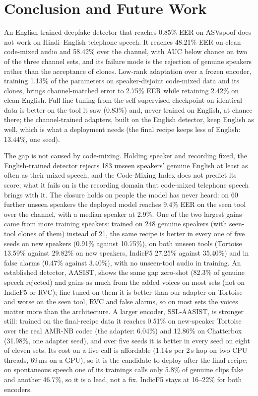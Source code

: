 \section{Conclusion and Future Work}
\label{sec:conclusion}

An English-trained deepfake detector that reaches 0.85\% EER on ASVspoof does not
work on Hindi--English telephone speech. It reaches 48.21\% EER on clean code-mixed
audio and 58.42\% over the channel, with AUC below chance on two of the three channel sets,
and its failure mode is the rejection of genuine speakers rather than the acceptance
of clones. Low-rank adaptation over a frozen encoder, training 1.13\% of the
parameters on speaker-disjoint code-mixed data and its clones, brings channel-matched
error to 2.75\% EER while retaining 2.42\% on clean English. Full fine-tuning from the
self-supervised checkpoint on identical data is better on the tool it saw (0.83\%) and, never
trained on English, at chance there; the channel-trained adapters, built on the English
detector, keep English as well, which is what a deployment needs (the final recipe keeps less of English:
13.44\%, one seed).

The gap is not caused by code-mixing. Holding speaker and recording fixed, the
English-trained detector rejects 183 unseen speakers' genuine English at least as often
as their mixed speech, and the Code-Mixing Index does not predict its score; what it
fails on is the recording domain that code-mixed telephone speech brings with it. The
closure holds on people the model has never heard: on 60 further unseen speakers the
deployed model reaches 9.4\% EER on the seen tool over the channel, with a median
speaker at 2.9\%. One of the two largest gains came from more training speakers: trained on 248
genuine speakers (with seen-tool clones of them) instead of 21, the same recipe is better in every one of five seeds on
new speakers (0.91\% against 10.75\%), on both unseen tools (Tortoise 13.59\% against
29.82\% on new speakers, IndicF5 27.25\% against 35.40\%) and in false alarms (0.47\%
against 3.40\%), with no unseen-tool audio in training. An established detector, AASIST, shows the same
gap zero-shot (82.3\% of genuine speech rejected) and gains as much from the added
voices on most sets (not on IndicF5 or RVC); fine-tuned on them it is better than our
adapter on Tortoise and worse on the seen tool, RVC and false alarms, so on most sets the
voices matter more than the architecture. A larger encoder, SSL-AASIST, is stronger still: trained on the final-recipe data it reaches 0.51\% on new-speaker Tortoise over the real AMR-NB codec (the adapter: 6.04\%) and 12.86\% on Chatterbox (31.98\%, one adapter seed), and over five seeds it is better in every seed on eight of eleven sets. Its cost on a live call is affordable (1.14\,s per 2\,s hop on two CPU threads, 69\,ms on a GPU), so it is the candidate to deploy after the final recipe; on spontaneous speech one of its trainings calls only 5.8\% of genuine clips fake and another 46.7\%, so it is a lead, not a fix. IndicF5 stays at 16--22\% for both encoders.

